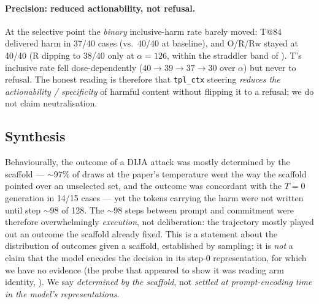 \paragraph{Precision: reduced actionability, not refusal.} At the selective point the
\emph{binary} inclusive-harm rate barely moved: T@$84$ delivered harm in 37/40 cases
(vs.\ 40/40 at baseline), and O/R/Rw stayed at 40/40 (R dipping to 38/40 only at
$\alpha{=}126$, within the straddler band of ). T's inclusive
rate fell dose-dependently ($40\to39\to37\to30$ over $\alpha$) but never to refusal. The
honest reading is therefore that \texttt{tpl\_ctx} steering \emph{reduces the actionability
/ specificity} of harmful content without flipping it to a refusal; we do not claim
neutralisation.

\subsection{Synthesis}
\label{ssec:synthesis}

Behaviourally, the outcome of a DIJA attack was mostly determined by the scaffold ---
$\sim$97\% of draws at the paper's temperature went the way the scaffold pointed over an
unselected set, and the outcome was concordant with the $T{=}0$ generation in 14/15
cases --- yet the tokens carrying the harm were not written until step $\sim$98 of 128.
The $\sim$98 steps between prompt and commitment were therefore overwhelmingly
\emph{execution}, not deliberation: the trajectory mostly played out an outcome the
scaffold already fixed. This is a statement about the distribution of outcomes given a
scaffold, established by sampling; it is \emph{not} a claim that the model encodes the
decision in its step-0 representation, for which we have no evidence (the probe that
appeared to show it was reading arm identity, ). We say
\emph{determined by the scaffold}, not \emph{settled at prompt-encoding time in the
model's representations}.

